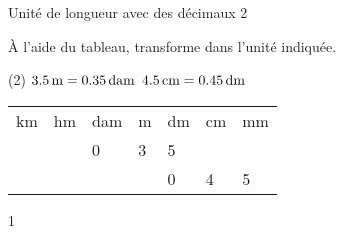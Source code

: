 \documentclass[a4paper,11pt]{report}
\begin{document}
\begin{resolu}{Unité de longueur avec des décimaux 2}
{À l'aide du tableau, transforme dans l'unité indiquée.

\begin{tasks}(2)
  \task $\tunit{3,5}{\m}= \tunit{0,35}{\deca  m}$
    \task $\tunit{4,5}{\centi m} = \tunit{0,45}{\deci m}$
    
\end{tasks}
\begin{center}


\begin{tabular}{*{7}{|x{1.5cm}}|}
 \hline
   km & hm & dam &m &dm &cm&mm\\   
 &   &0 & 3&5 & & \\ 
 \hline

 &  & & & 0& 4&5 \\
\hline

\end{tabular}
\end{center}
}
{1}
\end{resolu}
\end{document}
